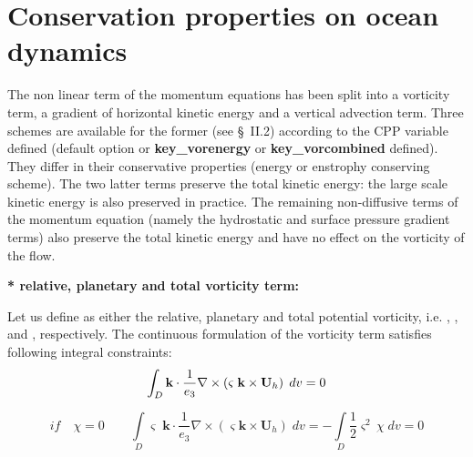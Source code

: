 \documentclass[../tex_main/NEMO_manual]{subfiles}
\begin{document}
\section{Conservation properties on ocean dynamics}
\label{sec:Invariant_dyn}

The non linear term of the momentum equations has been split into a 
vorticity term, a gradient of horizontal kinetic energy and a vertical 
advection term. Three schemes are available for the former (see {\S}~II.2) 
according to the CPP variable defined (default option\textbf{ 
}or \textbf{key{\_}vorenergy } or \textbf{key{\_}vorcombined 
} defined). They differ in their conservative 
properties (energy or enstrophy conserving scheme). The two latter terms 
preserve the total kinetic energy: the large scale kinetic energy is also 
preserved in practice. The remaining non-diffusive terms of the momentum 
equation (namely the hydrostatic and surface pressure gradient terms) also 
preserve the total kinetic energy and have no effect on the vorticity of the 
flow.

\textbf{* relative, planetary and total vorticity term:}

Let us define as either the relative, planetary and total potential 
vorticity, i.e. , , and , respectively. The continuous formulation of the 
vorticity term satisfies following integral constraints:
\begin{equation} \label{eq:vor_vorticity}
\int_D {{\textbf {k}}\cdot \frac{1}{e_3 }\nabla \times \left( {\varsigma 
\;{\rm {\bf k}}\times {\textbf {U}}_h } \right)\;dv} =0
\end{equation}

\begin{equation} \label{eq:vor_enstrophy}
if\quad \chi =0\quad \quad \int\limits_D {\varsigma \;{\textbf{k}}\cdot 
\frac{1}{e_3 }\nabla \times \left( {\varsigma {\textbf{k}}\times {\textbf{U}}_h } \right)\;dv} =-\int\limits_D {\frac{1}{2}\varsigma ^2\,\chi \;dv} 
=0
\end{equation}
\end{document}

